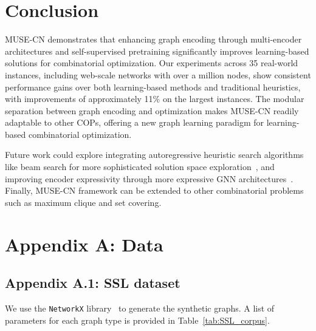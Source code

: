 \documentclass{article}
\begin{document}
    
    



\section{Conclusion}


MUSE-CN demonstrates that enhancing graph encoding through multi-encoder architectures and self-supervised pretraining significantly improves learning-based solutions for combinatorial optimization. Our experiments across 35 real-world instances, including web-scale networks with over a million nodes, show consistent performance gains over both learning-based methods and traditional heuristics, with improvements of approximately 11\% on the largest instances. The modular separation between graph encoding and optimization makes MUSE-CN readily adaptable to other COPs, offering a new graph learning paradigm for learning-based combinatorial optimization.

Future work could explore integrating autoregressive heuristic search algorithms like beam search for more sophisticated solution space exploration~\cite{lowerre1976harpy}, and improving encoder expressivity through more expressive GNN architectures~\cite{rampavsek2022recipe}. Finally, MUSE-CN framework can be extended to other combinatorial problems such as maximum clique and set covering.





\appendix



\section{Appendix A: Data}

\subsection{Appendix A.1: SSL dataset}\label{app:ssl_dataset}


We use the \texttt{NetworkX} library~\cite{hagberg2020networkx} to generate the synthetic graphs. A list of parameters for each graph type is provided in Table~\ref{tab:SSL_corpus}.
\end{document}
